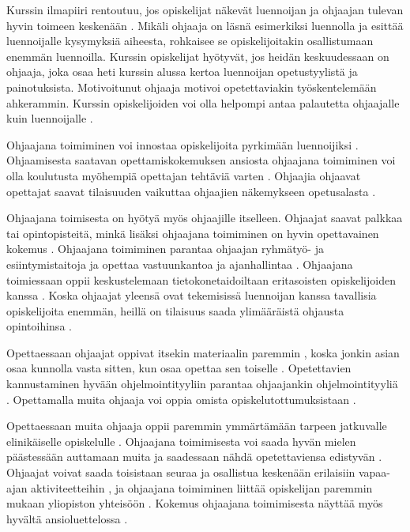 \documentclass[finnish]{tktltiki2}
\theoremstyle{definition}
\theoremstyle{remark}
\begin{document}
Kurssin ilmapiiri rentoutuu, jos opiskelijat näkevät luennoijan ja ohjaajan tulevan hyvin toimeen keskenään \cite{Dickson11}. Mikäli ohjaaja on läsnä esimerkiksi luennolla ja esittää luennoijalle kysymyksiä aiheesta, rohkaisee se opiskelijoitakin osallistumaan enemmän luennoilla. Kurssin opiskelijat hyötyvät, jos heidän keskuudessaan on ohjaaja, joka osaa heti kurssin alussa kertoa luennoijan opetustyylistä ja painotuksista. Motivoitunut ohjaaja motivoi opetettaviakin työskentelemään ahkerammin. Kurssin opiskelijoiden voi olla helpompi antaa palautetta ohjaajalle kuin luennoijalle \cite{Morgan02}. \par

Ohjaajana toimiminen voi innostaa opiskelijoita pyrkimään luennoijiksi \cite{Morgan02}. Ohjaamisesta saatavan opettamiskokemuksen ansiosta ohjaajana toimiminen voi olla koulutusta myöhempiä opettajan tehtäviä varten \cite{Roberts95}. Ohjaajia ohjaavat opettajat saavat tilaisuuden vaikuttaa ohjaajien näkemykseen opetusalasta \cite{Morgan02}. \par

Ohjaajana toimisesta on hyötyä myös ohjaajille itselleen. Ohjaajat saavat palkkaa tai opintopisteitä, minkä lisäksi ohjaajana toimiminen on hyvin opettavainen kokemus \cite{Reges03}. Ohjaajana toimiminen parantaa ohjaajan ryhmätyö- ja esiintymistaitoja \cite{Reges03} ja opettaa vastuunkantoa \cite{Dickson11} ja ajanhallintaa \cite{Aminzadeh}. Ohjaajana toimiessaan oppii keskustelemaan tie\-to\-ko\-ne\-tai\-doil\-taan eritasoisten opiskelijoiden kanssa \cite{Vikberg}. Koska ohjaajat yleensä ovat tekemisissä luennoijan kanssa tavallisia opiskelijoita enemmän, heillä on tilaisuus saada ylimääräistä ohjausta opintoihinsa \cite{Aminzadeh}. \par

Opettaessaan ohjaajat oppivat itsekin materiaalin paremmin \cite{Reges03}, koska jonkin asian osaa kunnolla vasta sitten, kun osaa opettaa sen toiselle \cite{Bernstein, Dickson11}. Opetettavien kannustaminen hyvään ohjelmointityyliin parantaa ohjaajankin ohjelmointityyliä \cite{Roberts95}. Opettamalla muita ohjaaja voi oppia omista opiskelutottumuksistaan \cite{Ferstl10}.  \par

Opettaessaan muita ohjaaja oppii paremmin ymmärtämään tarpeen jatkuvalle elinikäiselle opiskelulle \cite{Paxton05}. Ohjaajana toimimisesta voi saada hyvän mielen päästessään auttamaan muita \cite{Aminzadeh} ja saadessaan nähdä opetettaviensa edistyvän \cite{Kurhila11}. Ohjaajat voivat saada toisistaan seuraa ja osallistua keskenään erilaisiin vapaa-ajan aktiviteetteihin \cite{Roberts95}, ja ohjaajana toimiminen liittää opiskelijan paremmin mukaan yliopiston yhteisöön \cite{Dickson11}. Kokemus ohjaajana toimimisesta näyttää myös hyvältä ansioluettelossa \cite{Ferstl10}. \par
\end{document}
